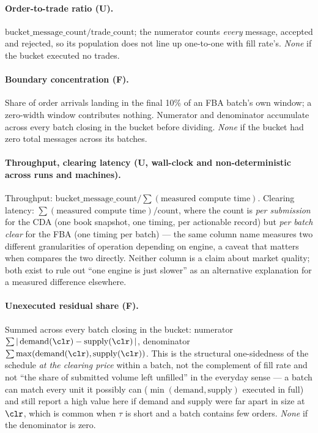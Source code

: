 \paragraph{Order-to-trade ratio (U).} $\mathrm{bucket\_message\_count} /
\mathrm{trade\_count}$; the numerator counts \emph{every} message,
accepted and rejected, so its population does not line up one-to-one
with fill rate's. \emph{None} if the bucket executed no trades.

\paragraph{Boundary concentration (F).} Share of order arrivals landing
in the final 10\% of an FBA batch's own window; a zero-width window
contributes nothing. Numerator and denominator accumulate across every
batch closing in the bucket before dividing. \emph{None} if the bucket
had zero total messages across its batches.

\paragraph{Throughput, clearing latency (U, wall-clock and
non-deterministic across runs and machines).} Throughput:
$\mathrm{bucket\_message\_count} / \sum(\text{measured compute time})$.
Clearing latency: $\sum(\text{measured compute time})/\mathrm{count}$,
where the count is \emph{per submission} for the CDA (one book snapshot,
one timing, per actionable record) but \emph{per batch clear} for the
FBA (one timing per batch) --- the same column name measures two
different granularities of operation depending on engine, a caveat that
matters when  compares the two directly. Neither column
is a claim about market quality; both exist to rule out ``one engine is
just slower'' as an alternative explanation for a measured difference
elsewhere.

\paragraph{Unexecuted residual share (F).} Summed across every batch
closing in the bucket: numerator $\sum |\,\mathrm{demand}(\clr) -
\mathrm{supply}(\clr)\,|$, denominator $\sum
\max(\mathrm{demand}(\clr),\mathrm{supply}(\clr))$. This is the
structural one-sidedness of the schedule \emph{at the clearing price}
within a batch, not the complement of fill rate and not ``the share of
submitted volume left unfilled'' in the everyday sense --- a batch can
match every unit it possibly can ($\min(\mathrm{demand},\mathrm{supply})$
executed in full) and still report a high value here if demand and
supply were far apart in size at $\clr$, which is common when $\tau$ is
short and a batch contains few orders. \emph{None} if the denominator is
zero.

